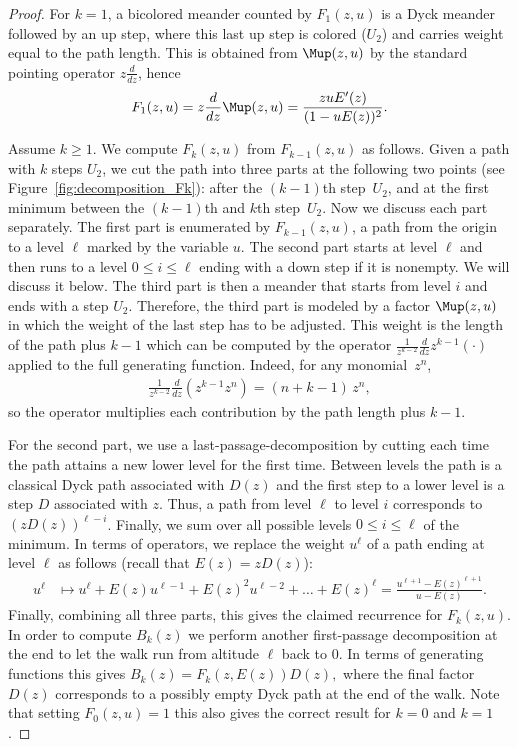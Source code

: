 \documentclass[a4paper,UKenglish,cleveref, autoref, thm-restate]{lipics-v2021}
\begin{document}
\begin{proof}
For $k=1$, a bicolored meander counted by $F_1(z,u)$ is a Dyck meander followed by an up step,
where this last up step is colored ($U_2$) and carries weight equal to the path length.
 This is obtained from $\Mup(z,u)$ by the standard pointing operator
$z\frac{d}{dz}$, hence
\begin{align}\label{eq:F1}
    F_1(z,u) 
        = z \frac{d}{dz} \Mup(z,u)
        = \frac{z uE'(z)}{(1-uE(z))^2}.
\end{align}

Assume $k\ge 1$. We compute $F_{k}(z,u)$ from $F_{k-1}(z,u)$ as follows.
Given a path with $k$ steps $U_2$, we cut the path into three parts at the following two points (see Figure~\ref{fig:decomposition_Fk}):
after the $(k-1)$th step~$U_2$, and at the first minimum between the $(k-1)$th and $k$th step~$U_2$.
Now we discuss each part separately. 
The first part is enumerated by $F_{k-1}(z,u)$, a path from the origin to a level $\ell$ marked by the variable $u$.
The second part starts at level $\ell$ and then runs to a level $0 \leq i \leq \ell$ ending with a down step if it is nonempty. 
We will discuss it below.
The third part is then a meander that starts from level $i$ and ends with a step $U_2$.
Therefore, the third part is modeled by a factor $\Mup(z,u)$ in which the weight of the last step has to be adjusted.
This weight is the length of the path plus $k-1$ which can be computed by the operator $\frac{1}{z^{k-2}}\frac{d}{dz} z^{k-1} (\cdot)$ applied to the full generating function. 
Indeed, for any monomial~$z^n$, 
\begin{align*}
\frac{1}{z^{k-2}}\frac{d}{dz}\!\left(z^{k-1}z^n\right) = (n+k-1)\,z^n,
\end{align*}
so the operator multiplies each contribution by the path length plus $k-1$.

For the second part, we use a last-passage-decomposition by cutting each time the path attains a new lower level for the first time.
Between levels the path is a classical Dyck path associated with $D(z)$ and the first step to a lower level is a step $D$ associated with $z$. 
Thus, a path from level $\ell$ to level $i$ corresponds to $(zD(z))^{\ell-i}$.
Finally, we sum over all possible levels $0 \leq i \leq \ell$ of the minimum.
In terms of operators, we replace the weight $u^{\ell}$ of a path ending at level $\ell$ as follows (recall that $E(z) = z D(z)$):
\begin{align*}
    u^{\ell} 
        &\mapsto u^{\ell} + E(z)u^{\ell-1} + E(z)^2 u^{\ell-2} + \dots + E(z)^{\ell} 
        =  \frac{u^{\ell+1} -  E(z)^{\ell+1}}{u -  E(z)}.
\end{align*}
Finally, combining all three parts, this gives the claimed recurrence for $F_{k}(z,u)$.
In order to compute $B_{k}(z)$ we perform another first-passage decomposition at the end to let the walk run from altitude $\ell$ back to $0$. 
In terms of generating functions this gives
$
    B_k(z) = F_{k}(z, E(z)) D(z),
$
where the final factor $D(z)$ corresponds to a possibly empty Dyck path at the end of the walk.
Note that setting $F_{0}(z,u)=1$ this also gives the correct result for $k=0$ and $k=1$.
\end{proof}
\end{document}
